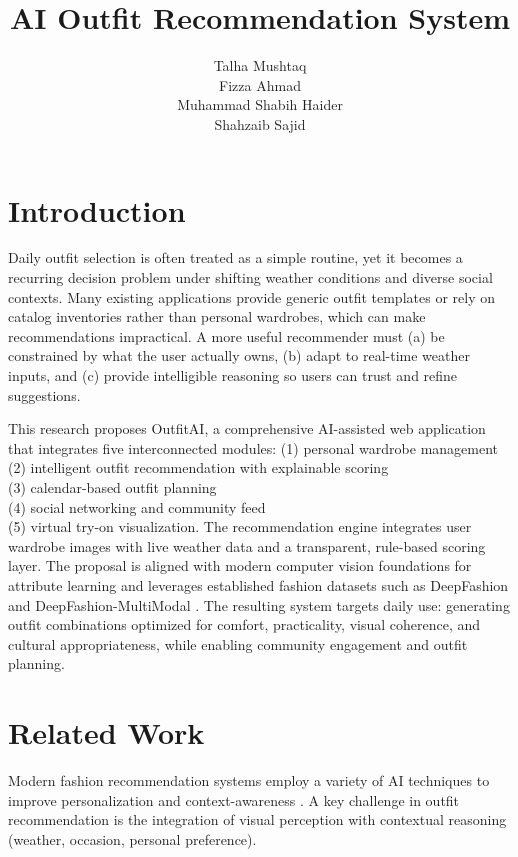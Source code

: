 \documentclass[stu,man]{apa7}
\title{AI Outfit Recommendation System}
\author{Talha Mushtaq\\
Fizza Ahmad\\ 
Muhammad Shabih Haider\\ 
Shahzaib Sajid}
\affiliation{Department of Computer Science, University of Engineering and Technology Lahore}
\begin{document}
\maketitle

\section{Introduction}
Daily outfit selection is often treated as a simple routine, yet it becomes a recurring decision problem under shifting weather conditions and diverse social contexts.
Many existing applications provide generic outfit templates or rely on catalog inventories rather than personal wardrobes, which can make recommendations impractical.
A more useful recommender must (a) be constrained by what the user actually owns, (b) adapt to real-time weather inputs, and (c) provide intelligible reasoning so users can trust and refine suggestions.

This research proposes OutfitAI, a comprehensive AI-assisted web application that integrates five interconnected modules: (1) personal wardrobe management\\ (2) intelligent outfit recommendation with explainable scoring\\(3) calendar-based outfit planning\\ (4) social networking and community feed\\ (5) virtual try-on visualization.
The recommendation engine integrates user wardrobe images with live weather data and a transparent, rule-based scoring layer.
The proposal is aligned with modern computer vision foundations for attribute learning \parencite{NIPS2012_c399862d} and leverages established fashion datasets such as DeepFashion \parencite{liuLQWTcvpr16DeepFashion} and DeepFashion-MultiModal \parencite{deepfashionmultimodal}.
The resulting system targets daily use: generating outfit combinations optimized for comfort, practicality, visual coherence, and cultural appropriateness, while enabling community engagement and outfit planning.
\newpage
\section{Related Work}
Modern fashion recommendation systems employ a variety of AI techniques to improve personalization and context-awareness \parencite{fashion2023review}.
A key challenge in outfit recommendation is the integration of visual perception with contextual reasoning (weather, occasion, personal preference).
\end{document}
